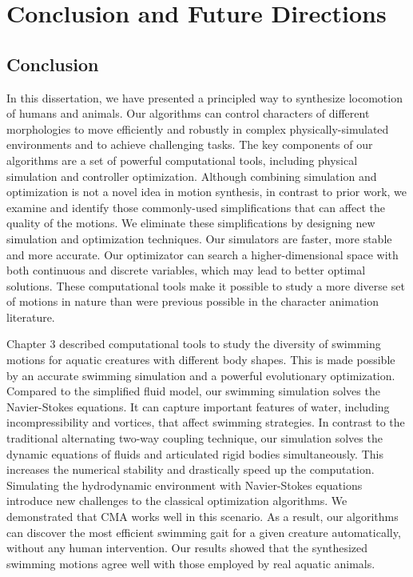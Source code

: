 \section{Conclusion and Future Directions}
\subsection{Conclusion}
In this dissertation, we have presented a principled way to synthesize locomotion of humans and animals. Our algorithms can control characters of different morphologies to move efficiently and robustly in complex physically-simulated environments and to achieve challenging tasks. The key components of our algorithms are a set of powerful computational tools, including physical simulation and controller optimization. Although combining simulation and optimization is not a novel idea in motion synthesis, in contrast to prior work, we examine and identify those commonly-used simplifications that can affect the quality of the motions. We eliminate these simplifications by designing new simulation and optimization techniques. Our simulators are faster, more stable and more accurate. Our optimizator can search a higher-dimensional space with both continuous and discrete variables, which may lead to better optimal solutions. These computational tools make it possible to study a more diverse set of motions in nature than were previous possible in the character animation literature.

Chapter 3 described computational tools to study the diversity of swimming motions for aquatic creatures with different body shapes. This is made possible by an accurate swimming simulation and a powerful evolutionary optimization. Compared to the simplified fluid model, our swimming simulation solves the Navier-Stokes equations. It can capture important features of water, including incompressibility and vortices, that affect swimming strategies. In contrast to the traditional alternating two-way coupling technique, our simulation solves the dynamic equations of fluids and articulated rigid bodies simultaneously. This increases the numerical stability and drastically speed up the computation. Simulating the hydrodynamic environment with Navier-Stokes equations introduce new challenges to the classical optimization algorithms. We demonstrated that CMA works well in this scenario. As a result, our algorithms can discover the most efficient swimming gait for a given creature automatically, without any human intervention. Our results showed that the synthesized swimming motions agree well with those employed by real aquatic animals.

